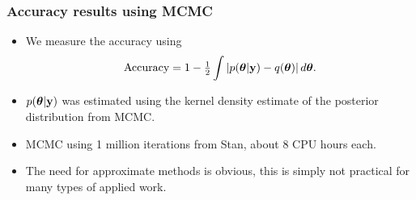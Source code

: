 \documentclass{beamer}
\begin{document}
	
	\begin{frame}
		\frametitle{Accuracy results using MCMC}
		\begin{itemize}
			\item	We measure the accuracy using
			      $$\text{Accuracy} = 1 - \tfrac{1}{2} \int \left |p({\boldsymbol \theta}|{\bf y}) - q({\boldsymbol \theta}) \right | d {\boldsymbol \theta}.$$
			\item	$p({\boldsymbol \theta}|{\bf y})$ was estimated using the kernel density estimate of the posterior
			      distribution from MCMC.
			\item MCMC using 1 million iterations from Stan, about 8 CPU hours each.
			\item The need for approximate methods is obvious, this is simply not
			      practical for many types of applied work.
		\end{itemize}
	\end{frame}
	
\end{document}
